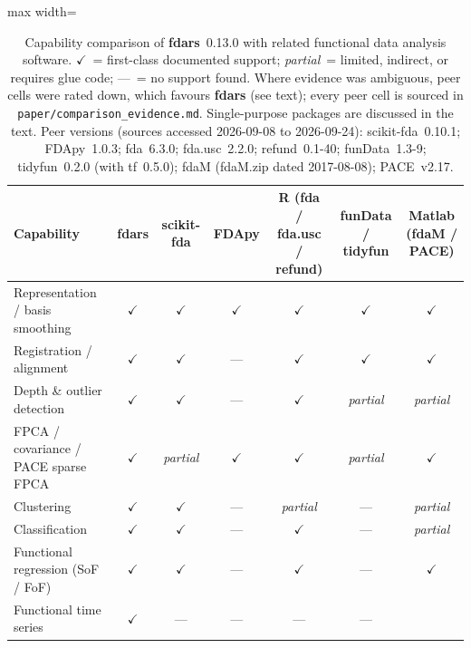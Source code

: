 \newcommand{\FdarsVersion}{0.13.0}

\begin{table}[htbp]
\centering
\small
\caption{Capability comparison of \textbf{fdars}~\FdarsVersion{} with related
  functional data analysis software.
  $\checkmark$~= first-class documented support;
  \textit{partial}~= limited, indirect, or requires glue code;
  ---~= no support found.
  Where evidence was ambiguous, peer cells were rated down, which favours
  \textbf{fdars} (see text); every peer cell is sourced in
  \texttt{paper/comparison\_evidence.md}. Single-purpose packages are
  discussed in the text.
  Peer versions (sources accessed 2026-09-08 to 2026-09-24):
  scikit-fda~0.10.1; FDApy~1.0.3;
  fda~6.3.0; fda.usc~2.2.0; refund~0.1-40;
  funData~1.3-9; tidyfun~0.2.0 (with tf~0.5.0);
  fdaM (fdaM.zip dated 2017-08-08); PACE~v2.17.}
\label{tab:comparison}
\begin{adjustbox}{max width=\textwidth}
\begin{tabular}{lcccccc}
\toprule
\textbf{Capability} &
  \textbf{fdars} &
  \textbf{scikit-fda} &
  \textbf{FDApy} &
  \textbf{R (fda / fda.usc / refund)} &
  \textbf{funData / tidyfun} &
  \textbf{Matlab (fdaM / PACE)} \\
\midrule
Representation / basis smoothing &
  $\checkmark$ &
  $\checkmark$ &
  $\checkmark$ &
  $\checkmark$ &
  $\checkmark$ &
  $\checkmark$ \\
Registration / alignment &
  $\checkmark$ &
  $\checkmark$ &
  --- &
  $\checkmark$ &
  $\checkmark$ &
  $\checkmark$ \\
Depth \& outlier detection &
  $\checkmark$ &
  $\checkmark$ &
  --- &
  $\checkmark$ &
  \textit{partial} &
  \textit{partial} \\
FPCA / covariance / PACE sparse FPCA &
  $\checkmark$ &
  \textit{partial} &
  $\checkmark$ &
  $\checkmark$ &
  \textit{partial} &
  $\checkmark$ \\
Clustering &
  $\checkmark$ &
  $\checkmark$ &
  --- &
  \textit{partial} &
  --- &
  \textit{partial} \\
Classification &
  $\checkmark$ &
  $\checkmark$ &
  --- &
  $\checkmark$ &
  --- &
  \textit{partial} \\
Functional regression (SoF / FoF) &
  $\checkmark$ &
  $\checkmark$ &
  --- &
  $\checkmark$ &
  --- &
  $\checkmark$ \\
Functional time series &
  $\checkmark$ &
  --- &
  --- &
  --- &
  --- &

\end{tabular}
\end{adjustbox}
\end{table}
